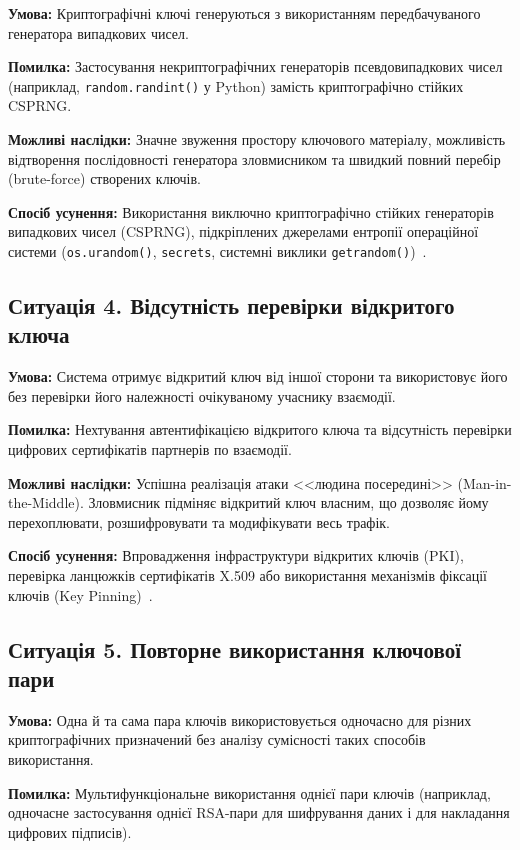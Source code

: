 \textbf{Умова:} Криптографічні ключі генеруються з використанням передбачуваного генератора випадкових
чисел.

\textbf{Помилка:} Застосування некриптографічних генераторів псевдовипадкових чисел (наприклад,
\texttt{random.randint()} у Python) замість криптографічно стійких CSPRNG.

\textbf{Можливі наслідки:} Значне звуження простору ключового матеріалу, можливість відтворення
послідовності генератора зловмисником та швидкий повний перебір (brute-force) створених ключів.

\textbf{Спосіб усунення:} Використання виключно криптографічно стійких генераторів випадкових чисел
(CSPRNG), підкріплених джерелами ентропії операційної системи (\texttt{os.urandom()}, \texttt{secrets},
системні виклики \texttt{getrandom()})~\cite{NIST80057}.

\subsection{Ситуація 4. Відсутність перевірки відкритого ключа}

\textbf{Умова:} Система отримує відкритий ключ від іншої сторони та використовує його без перевірки його
належності очікуваному учаснику взаємодії.

\textbf{Помилка:} Нехтування автентифікацією відкритого ключа та відсутність перевірки цифрових
сертифікатів партнерів по взаємодії.

\textbf{Можливі наслідки:} Успішна реалізація атаки <<людина посередині>> (Man-in-the-Middle).
Зловмисник підміняє відкритий ключ власним, що дозволяє йому перехоплювати, розшифровувати та
модифікувати весь трафік.

\textbf{Спосіб усунення:} Впровадження інфраструктури відкритих ключів (PKI), перевірка ланцюжків
сертифікатів X.509 або використання механізмів фіксації ключів (Key Pinning)~\cite{NIST80057}.

\subsection{Ситуація 5. Повторне використання ключової пари}

\textbf{Умова:} Одна й та сама пара ключів використовується одночасно для різних криптографічних
призначений без аналізу сумісності таких способів використання.

\textbf{Помилка:} Мультифункціональне використання однієї пари ключів (наприклад, одночасне
застосування однієї RSA-пари для шифрування даних і для накладання цифрових підписів).

